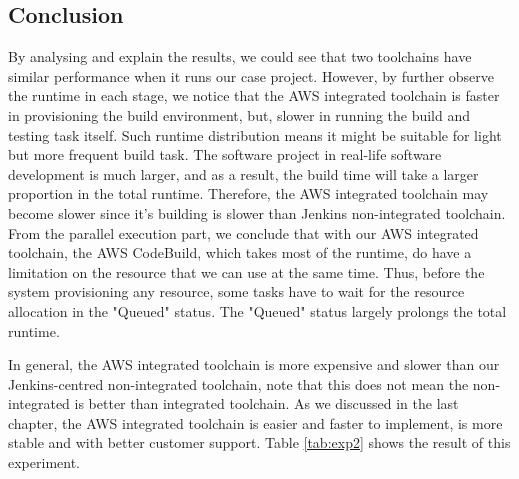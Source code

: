 \subsection{Conclusion}
By analysing and explain the results, we could see that two toolchains have similar performance when it runs our case project. However, by further observe the runtime in each stage, we notice that the AWS integrated toolchain is faster in provisioning the build environment, but, slower in running the build and testing task itself. Such runtime distribution means it might be suitable for light but more frequent build task. 
The software project in real-life software development is much larger, and as a result, the build time will take a larger proportion in the total runtime. Therefore, the AWS integrated toolchain may become slower since it's building is slower than Jenkins non-integrated toolchain.
From the parallel execution part, we conclude that with our AWS integrated toolchain, the AWS CodeBuild, which takes most of the runtime, do have a limitation on the resource that we can use at the same time. Thus, before the system provisioning any resource, some tasks have to wait for the resource allocation in the "Queued" status. The "Queued" status largely prolongs the total runtime. 
\par
In general, the AWS integrated toolchain is more expensive and slower than our Jenkins-centred non-integrated toolchain, note that this does not mean the non-integrated is better than integrated toolchain. As we discussed in the last chapter, the AWS integrated toolchain is easier and faster to implement, is more stable and with better customer support. Table \ref{tab:exp2} shows the result of this experiment.
